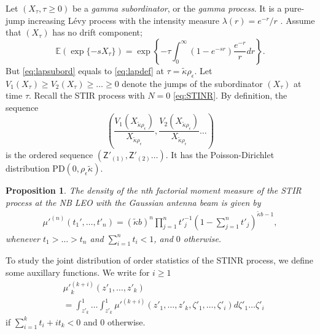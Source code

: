 \documentclass[lettersize,journal]{IEEEtran}
\newtheorem{prop}[theorem]{Proposition}
\begin{document}
Let $(X_{\tau}, \tau\geq 0)$ be a \textit{gamma subordinator}, or the \textit{gamma process}. It is a pure-jump increasing Lévy process with the intensity measure $\lambda(r) = e^{- r}/r$ . Assume that $(X_{\tau})$ has no drift component;
\begin{equation}
  \label{eq:lapsubord}
  \mathbb{E}(\exp\{-s X_{\tau}\}) = \exp\left\{-{\tau} \int_0^{\infty}(1-e^{-s r})\frac{e^{-r}}{r} dr \right\}.
\end{equation}
But \eqref{eq:lapsubord} equals to \eqref{eq:lapdef} at $\tau=\tilde{\kappa}\rho_{\epsilon} $. Let $V_1(X_{\tau}) \geq V_2(X_{\tau})\geq \dots \geq 0 $ denote the jumps of the subordinator $(X_{\tau})$ at time $\tau$. Recall the STIR process with $N=0$ \eqref{eq:STINR}. By definition, the sequence
\begin{equation}
  \label{eq:relativesequence}
  \left(\frac{V_1(X_{\tilde{\kappa}\rho_{\epsilon}})}{X_{\tilde{\kappa}\rho_{\epsilon}}},\frac{V_2(X_{\tilde{\kappa}\rho_{\epsilon}})}{X_{\tilde{\kappa}\rho_{\epsilon}}} \dots \right)
\end{equation}
is the ordered sequence $(\mathsf{Z}'_{(1)},\mathsf{Z}'_{(2)} \dots)$. It has the Poisson-Dirichlet distribution PD$(0, \rho_{\epsilon} \tilde{\kappa})$. 




\begin{prop}
  The density of the nth factorial moment measure of the STIR process at the NB LEO with the Gaussian antenna beam is given by
  \begin{align}
    \label{eq:factorialmoment}
    \mu'^{(n)}(t_1',\dots,t'_n) = (\tilde{\kappa}b)^n\prod_{j=1}^n{t'}_{j}^{-1}\left(1- \sum_{j=1}^nt'_j \right)^{\tilde{\kappa}b-1},       
  \end{align}
  whenever $t_1>\dots >t_n$ and $\sum_{i=1}^n t_i <1$, and $0$ otherwise.
\end{prop}
To study the joint distribution of order statistics of the STINR process, we define some auxillary functions. We write for $i\geq 1$
\begin{align}
  \label{eq:auxillary}
  &{\mu'}_k^{(k+i)}(z'_1,\dots,z'_k) \nonumber \\
  &= \int_{z'_k}^1 \dots \int_{z'_k}^1 {\mu'}^{(k+i)}(z'_1,\dots,z'_k,\zeta'_1,\dots,\zeta'_i) d\zeta'_1 \dots \zeta'_i
\end{align}
if $\sum_{i=1}^k t_i + it_k <0$ and $0$ otherwise. 
\end{document}
